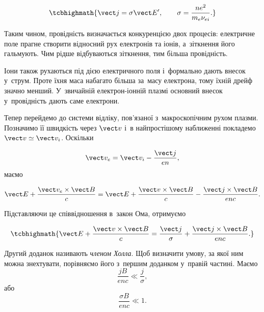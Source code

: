 \begin{equation}\label{eq:ohm-electron-frame}
	\tcbhighmath{\vect j=\sigma\vect E',\qquad
		\sigma=\frac{ne^2}{m_e\nu_{ei}}.}
\end{equation}

Таким чином, провідність визначається конкуренцією двох процесів: електричне поле прагне
створити відносний рух електронів та іонів, а~зіткнення його гальмують. Чим рідше
відбуваються зіткнення, тим більша провідність.

Іони також рухаються під дією електричного поля і~формально дають внесок у~струм. Проте
їхня маса набагато більша за~масу електрона, тому їхній дрейф значно менший. У~звичайній
електрон-іонній плазмі основний внесок у~провідність дають саме електрони.

Тепер перейдемо до системи відліку, пов'язаної з~макроскопічним рухом плазми. Позначимо її
швидкість через $\vect v$ і~в найпростішому наближенні покладемо $\vect v\simeq\vect v_i$.
Оскільки

\begin{equation*}
	\vect v_e=\vect v_i-\frac{\vect j}{en},
\end{equation*}
маємо

\begin{equation*}
	\vect E+\frac{\vect v_e\times\vect B}{c}
	=
	\vect E+\frac{\vect v\times\vect B}{c}
	-\frac{\vect j\times\vect B}{enc}.
\end{equation*}

Підставляючи це співвідношення в~закон Ома, отримуємо

\begin{equation}\label{eq:generalized-ohm-simple}
	\tcbhighmath{
		\vect E+\frac{\vect v\times\vect B}{c}
		=
		\frac{\vect j}{\sigma}
		+\frac{\vect j\times\vect B}{enc}.
	}
\end{equation}

Другий доданок називають \emph{членом Холла}. Щоб визначити умову, за якої ним можна знехтувати, порівняємо його з~першим доданком у~правій частині. Маємо
\begin{equation*}
\frac{jB}{enc}\ll\frac{j}{\sigma},
\end{equation*}
або
\begin{equation*}
\frac{\sigma B}{enc}\ll1.
\end{equation*}

